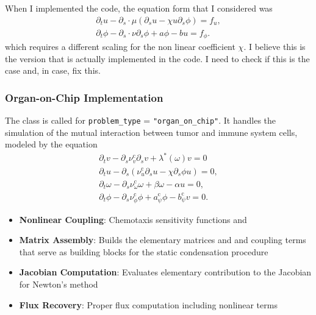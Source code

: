 \begin{warningbox}
	When I implemented the code, the equation form that I considered was
	\begin{gather*}\label{KS1}
		\partial_t u - \partial_s\cdot \mu (\partial_s u - \chi u \partial_s \phi) = f_u,\\ 
	\partial_t \phi - \partial_s\cdot \nu \partial_s \phi + a \phi - b u = f_{\phi}.
	\end{gather*}
	which requires a different scaling for the non linear coefficient $\chi$. I believe this is the version that is actually implemented in the code. I need to check if this is the case and, in case, fix this.
\end{warningbox}

\newcommand{\ds}{\partial_s}
\newcommand{\vc}{v}
\newcommand{\uc}{u}
\newcommand{\pc}{\omega}
\newcommand{\qc}{\phi}



\subsubsection{Organ-on-Chip Implementation}
The  class is called for {\tt problem\_type} = {\tt "organ\_on\_chip"}. It handles the simulation of the mutual interaction between tumor and immune system cells, modeled by the equation
\begin{gather*}
	\partial_t \vc - \ds \nu_v^\text{c} \ds \vc + \lambda^*  (\pc) \vc = 0  \\
		\partial_t \uc - \ds (\nu_u^\text{c} \ds \uc - \chi \ds \qc \uc) = 0,\\
		\partial_t \pc - \ds \nu_\omega^\text{c} \pc + \beta \pc  - \alpha \uc = 0,  \\
		\partial_t \qc - \ds  \nu_\phi^\text{c} \qc + a^\text{c}_\psi \qc  - b^\text{c}_\psi \vc = 0.
\end{gather*}
\begin{itemize}
	\item \textbf{Nonlinear Coupling}: Chemotaxis sensitivity functions  and 
	\item \textbf{Matrix Assembly}: Builds the elementary matrices and and coupling terms that serve as building blocks for the static condensation procedure 
	\item \textbf{Jacobian Computation}: Evaluates elementary contribution to the Jacobian for Newton's method
	\item \textbf{Flux Recovery}: Proper flux computation including nonlinear terms
\end{itemize}

